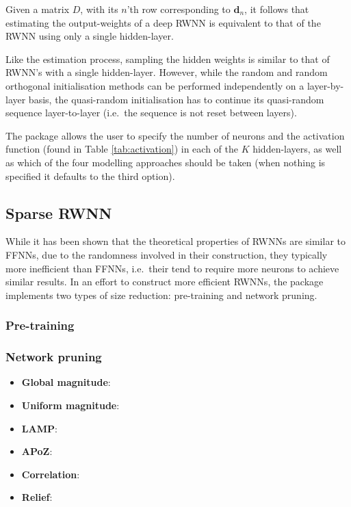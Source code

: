 \documentclass[
]{jss}
\providecommand{\tightlist}{%
  \setlength{\itemsep}{0pt}\setlength{\parskip}{0pt}}
\begin{document}
Given a matrix \(D\), with its \(n\)'th row corresponding to
\(\boldsymbol{d}_n\), it follows that estimating the output-weights of a
deep RWNN is equivalent to that of the RWNN using only a single
hidden-layer.

Like the estimation process, sampling the hidden weights is similar to
that of RWNN's with a single hidden-layer. However, while the random and
random orthogonal initialisation methods can be performed independently
on a layer-by-layer basis, the quasi-random initialisation has to
continue its quasi-random sequence layer-to-layer (i.e.~the sequence is
not reset between layers).

The  package allows the user to specify the number of neurons
and the activation function (found in Table \ref{tab:activation}) in
each of the \(K\) hidden-layers, as well as which of the four modelling
approaches should be taken (when nothing is specified it defaults to the
third option).

\hypertarget{sparse-rwnn}{%
\subsection{Sparse RWNN}\label{sparse-rwnn}}

While it has been shown that the theoretical properties of RWNNs are
similar to FFNNs, due to the randomness involved in their construction,
they typically more inefficient than FFNNs, i.e.~their tend to require
more neurons to achieve similar results. In an effort to construct more
efficient RWNNs, the  package implements two types of size
reduction: pre-training and network pruning.

\hypertarget{pre-training}{%
\subsubsection{Pre-training}\label{pre-training}}

\hypertarget{network-pruning}{%
\subsubsection{Network pruning}\label{network-pruning}}

\begin{itemize}
\tightlist
\item
  \textbf{Global magnitude}:
\item
  \textbf{Uniform magnitude}:
\item
  \textbf{LAMP}:
\item
  \textbf{APoZ}:
\item
  \textbf{Correlation}:
\item
  \textbf{Relief}:
\end{itemize}
\end{document}
